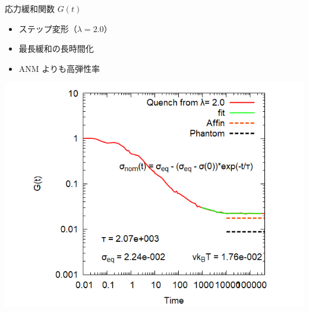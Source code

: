 \documentclass[12pt, dvipdfmx]{beamer}
\begin{document}
\begin{frame}
\begin{columns}[T, onlytextwidth]
				\begin{block}{応力緩和関数 $G(t)$}
					\begin{itemize}
						\item ステップ変形（$\lambda=2.0$）
						\item 最長緩和の長時間化
						\item ANM よりも高弾性率
					\end{itemize}
					\includegraphics[width=\textwidth]{gt_N48_C4_M3.png}
				\end{block}
		\end{columns}
\end{frame}

				
\end{document}

